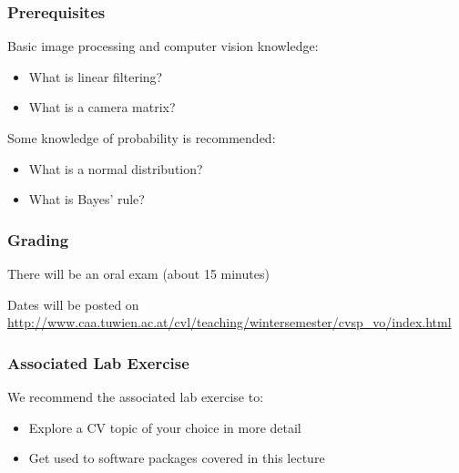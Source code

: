 \documentclass[xetex]{beamer}
\begin{document}

\begin{frame}
\frametitle{Prerequisites}

Basic image processing and computer vision knowledge:
\begin{itemize}
	\item What is linear filtering?
	\item What is a camera matrix?
\end{itemize}

\bigskip
Some knowledge of probability is recommended:
\begin{itemize}
	\item What is a normal distribution?
	\item What is Bayes' rule?
\end{itemize}

\end{frame}


\begin{frame}
\frametitle{Grading}

There will be an oral exam (about 15 minutes)

\bigskip
Dates will be posted on \url{http://www.caa.tuwien.ac.at/cvl/teaching/wintersemester/cvsp_vo/index.html}

\end{frame}


\begin{frame}
\frametitle{Associated Lab Exercise}

We recommend the associated lab exercise to:
\begin{itemize}
	\item Explore a CV topic of your choice in more detail
	\item Get used to software packages covered in this lecture
\end{itemize}

\end{frame}
\end{document}
